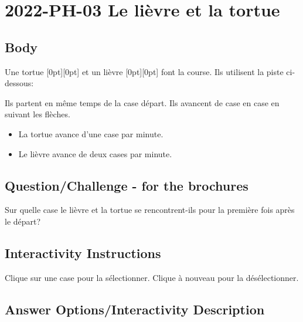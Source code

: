 \documentclass[a4paper,11pt]{report}
\newcommand{\taskGraphicsFolder}{..}
\begin{document}
\section*{\centering{} 2022-PH-03 Le lièvre et la tortue}


\subsection*{Body}

Une tortue \raisebox{-0.5ex}[0pt][0pt]{} et un lièvre \raisebox{-0.5ex}[0pt][0pt]{} font la course. Ils utilisent la piste ci-dessous:

{\centering%
\par}

Ils partent en même temps de la case départ. Ils avancent de case en case en suivant les flèches.

\begin{itemize}
  \item La tortue avance d’une case par minute.
  \item Le lièvre avance de deux cases par minute.
\end{itemize}

{\em


\subsection*{Question/Challenge - for the brochures}

Sur quelle case le lièvre et la tortue se rencontrent-ils pour la première fois après le départ?

}


\subsection*{Interactivity Instructions}

Clique sur une case pour la sélectionner. Clique à nouveau pour la désélectionner.

\begingroup
\renewcommand{\arraystretch}{1.5}
\subsection*{Answer Options/Interactivity Description}
\end{document}
